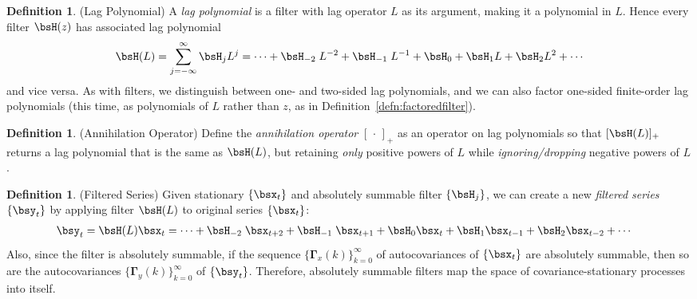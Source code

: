 \documentclass[12pt]{article}
\theoremstyle{plain}
\theoremstyle{definition}
\newtheorem{defn}[thm]{Definition}
\theoremstyle{remark}
\newcommand{\bsGamma}{\boldsymbol{\Gamma}}
\begin{document}
\begin{defn}(Lag Polynomial)
A \emph{lag polynomial} is a filter with lag operator $L$ as its
argument, making it a polynomial in $L$. Hence every filter $\bsH(z)$
has associated lag polynomial
\begin{align*}
  \bsH(L) = \sum_{j=-\infty}^\infty \bsH_j L^j
  = \cdots + \bsH_{-2}\;L^{-2} + \bsH_{-1}\;L^{-1} +
    \bsH_0 + \bsH_1 L + \bsH_2L^2 + \cdots
\end{align*}
and vice versa.
As with filters, we distinguish between one- and two-sided lag
polynomials, and we can also factor one-sided finite-order lag
polynomials (this time, as polynomials of $L$ rather than $z$, as in
Definition~\ref{defn:factoredfilter}).
\end{defn}

\begin{defn}(Annihilation Operator)
Define the \emph{annihilation operator} $[\,\cdot\,]_+$ as an operator
on lag polynomials so that $[\bsH(L)]_+$ returns a lag polynomial that
is the same as $\bsH(L)$, but retaining \emph{only} positive powers of
$L$ while \emph{ignoring/dropping} negative powers of $L$.
\end{defn}

\begin{defn}(Filtered Series)
Given stationary $\{\bsx_t\}$ and absolutely summable filter
$\{\bsH_j\}$,
we can create a new \emph{filtered series} $\{\bsy_t\}$ by applying
filter $\bsH(L)$ to original series $\{\bsx_t\}$:
\begin{align*}
  \bsy_t =&\; \bsH(L)\bsx_t
  = \cdots + \bsH_{-2}\;\bsx_{t+2} + \bsH_{-1}\;\bsx_{t+1} +
  \bsH_0\bsx_t + \bsH_1 \bsx_{t-1} + \bsH_2\bsx_{t-2} + \cdots
\end{align*}
Also, since the filter is absolutely summable,
if the sequence $\{\bsGamma_x(k)\}_{k=0}^\infty$ of
autocovariances of $\{\bsx_t\}$ are absolutely
summable, then so are the autocovariances
$\{\bsGamma_y(k)\}_{k=0}^\infty$ of $\{\bsy_t\}$.
Therefore, absolutely summable filters map the space of
covariance-stationary processes into itself.
\end{defn}
\end{document}
